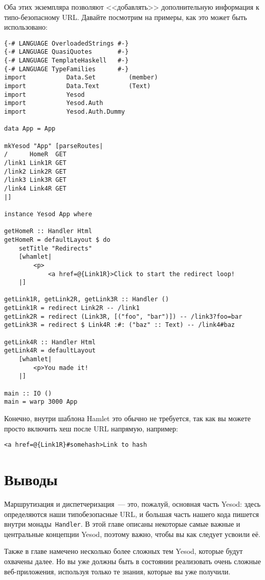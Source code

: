 Оба этих экземпляра позволяют <<добавлять>> дополнительную информация к
типо-безопасному URL. Давайте посмотрим на примеры, как это может быть
использовано:
\begin{lstlisting}
{-# LANGUAGE OverloadedStrings #-}
{-# LANGUAGE QuasiQuotes       #-}
{-# LANGUAGE TemplateHaskell   #-}
{-# LANGUAGE TypeFamilies      #-}
import           Data.Set         (member)
import           Data.Text        (Text)
import           Yesod
import           Yesod.Auth
import           Yesod.Auth.Dummy

data App = App

mkYesod "App" [parseRoutes|
/      HomeR  GET
/link1 Link1R GET
/link2 Link2R GET
/link3 Link3R GET
/link4 Link4R GET
|]

instance Yesod App where

getHomeR :: Handler Html
getHomeR = defaultLayout $ do
    setTitle "Redirects"
    [whamlet|
        <p>
            <a href=@{Link1R}>Click to start the redirect loop!
    |]

getLink1R, getLink2R, getLink3R :: Handler ()
getLink1R = redirect Link2R -- /link1
getLink2R = redirect (Link3R, [("foo", "bar")]) -- /link3?foo=bar
getLink3R = redirect $ Link4R :#: ("baz" :: Text) -- /link4#baz

getLink4R :: Handler Html
getLink4R = defaultLayout
    [whamlet|
        <p>You made it!
    |]

main :: IO ()
main = warp 3000 App
\end{lstlisting}

Конечно, внутри шаблона Hamlet это обычно не требуется, так как вы можете
просто включить хеш после URL напрямую, например:
\begin{lstlisting}
<a href=@{Link1R}#somehash>Link to hash
\end{lstlisting}

\section{Выводы}
Маршрутизация и диспетчеризация~--- это, пожалуй, основная часть Yesod: здесь
определяются наши типобезопасные URL, и большая часть нашего кода
пишется внутри монады~\lstinline!Handler!. В этой главе описаны
некоторые самые важные и центральные концепции Yesod, поэтому важно,
чтобы вы как следует усвоили её.

Также в главе намечено несколько более сложных тем Yesod, которые
будут охвачены далее. Но вы уже должны быть в состоянии реализовать
очень сложные веб-приложения, используя только те знания,
которые вы уже получили.
